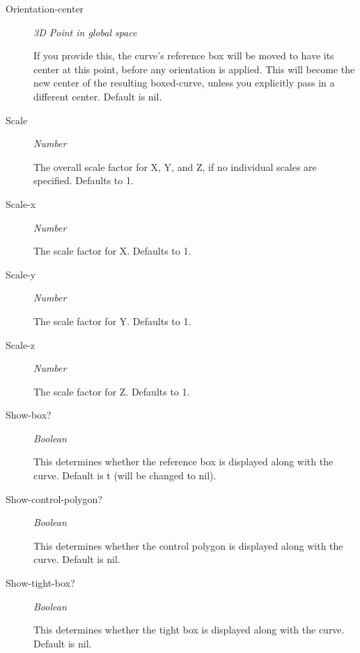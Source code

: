 \documentclass [11pt]{book}
\begin{document}
\begin{itemize}
\begin{description}
\item [Orientation-center]
\emph{3D Point in global space}

 If you provide this, the curve's reference box will be moved to have its center
at this point, before any orientation is applied. This will become the new center of the resulting boxed-curve,
unless you explicitly pass in a different center. Default is nil.




\item [Scale]
\emph{Number}

 The overall scale factor for X, Y, and Z, if no individual scales are specified. Defaults to 1.




\item [Scale-x]
\emph{Number}

 The scale factor for X. Defaults to 1.




\item [Scale-y]
\emph{Number}

 The scale factor for Y. Defaults to 1.




\item [Scale-z]
\emph{Number}

 The scale factor for Z. Defaults to 1.




\item [Show-box?]
\emph{Boolean}

 This determines whether the reference box is displayed along with the curve. Default is t (will be changed to nil).




\item [Show-control-polygon?]
\emph{Boolean}

 This determines whether the control polygon is displayed along with the curve. Default is nil.




\item [Show-tight-box?]
\emph{Boolean}

 This determines whether the tight box is displayed along with the curve. Default is nil.





\end{description}
\end{itemize}
\end{document}
